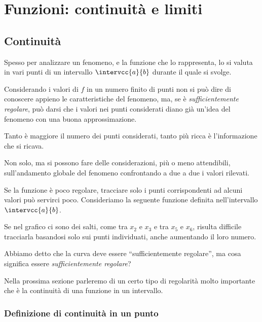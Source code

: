 


\chapter{Funzioni: continuità e limiti}

\section{Continuità}
\label{sec:cont_continuita}

Spesso per analizzare un fenomeno, e la funzione che lo rappresenta,  lo si 
valuta in vari punti di un intervallo \(\intervcc{a}{b}\) durante il 
quale si svolge.

{
Considerando i valori di \(f\) in un numero finito di punti non si può dire 
di conoscere appieno le caratteristiche del fenomeno, ma, se è 
\emph{sufficientemente regolare}, può darsi che i valori nei punti 
considerati diano già un'idea del fenomeno con una buona approssimazione.

Tanto è maggiore il numero dei punti considerati, tanto più ricca è 
l'informazione che si ricava. 

Non solo, ma si possono fare delle considerazioni, più o meno attendibili, 
sull'andamento globale del fenomeno confrontando a due a due i valori 
rilevati.
}
{\scalebox{1}{\partizionen}}

Se la funzione è poco regolare, tracciare solo i punti corrispondenti ad 
alcuni valori può servirci poco.
Consideriamo la seguente funzione definita nell'intervallo 
\(\intervcc{a}{b}\).

{\scalebox{1}{\puntigraficodiscontinuo}}
{\scalebox{1}{\graficodiscontinuo}}

Se nel grafico ci sono dei salti, come 
tra \(x_2\) e \(x_3\) e tra \(x_5\) e \(x_6\), risulta difficile tracciarla 
basandosi solo sui punti individuati, anche aumentando il loro numero.

Abbiamo detto che la curva deve essere ``sufficientemente regolare'',
ma cosa significa essere \emph{sufficientemente regolare}?

Nella prossima sezione parleremo di un certo tipo di regolarità molto 
importante che è la continuità di una funzione in un intervallo.

\subsection{Definizione di continuità in un punto}
\label{subsec:cont_definizione}

